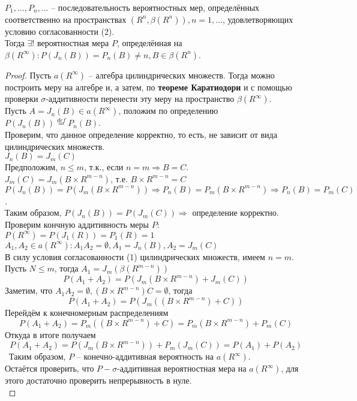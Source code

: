 \begin{theorem}
$P_1,...,P_n,...$ -- последовательность вероятностных мер, определённых соответственно на пространствах $(R^n, \beta (R^n)), n=1,...$, удовлетворяющих условию согласованности (2).\\
Тогда $\exists!$ вероятностная мера $P$, определённая на $\beta (R^\infty) : P(J_n(B))=P_n(B)\ne n, B \in \beta (R^n)$.
\end{theorem}
\begin{proof}
Пусть $a(R^\infty)$ -- алгебра цилиндрических множеств. Тогда можно построить меру на алгебре и, а затем, по \textbf{теореме Каратиодори} и с помощью проверки $\sigma$-аддитивности перенести эту меру на пространство $\beta (R^\infty)$.\\
Пусть $A=J_n(B)\in a(R^\infty)$, положим по определению $P(J_n(B))\stackrel{def}{=}P_n(B)$.\\
Проверим, что данное определение корректно, то есть, не зависит от вида цилиндрических множеств.\\
$J_n(B)=J_m(C)$\\
Предположим, $n\leq m$, т.к., если $n=m\Rightarrow B=C$.\\
$J_m(C)=J_m(B\times R^{m-n})$, т.е. $B\times R^{m-n}=C$\\
$P(J_n(B))=P(J_m(B\times R^{m-n}))\Rightarrow P_n(B) = P_m(B\times R^{m-n})\Rightarrow P_n(B)=P_m(C)$.\\
Таким образом, $P(J_n(B))=P(J_m(C))\Rightarrow$ определение корректно.\\
Проверим кончную аддитивность меры $P$:\\
$P(R^\infty)=P(J_1(R))=P_1(R)=1$\\
$A_1, A_2\in a(R^\infty): A_1 A_2 =\emptyset, A_1=J_n(B), A_2=J_m(C)$\\
В силу условия согласованности (1) цилиндрических множеств, имеем $n=m$.\\
Пусть $N\leq m$, тогда $A_1=J_m(\beta (R^{m-n}))$
$$P(A_1+A_2)=P(J_m(B\times R^{m-n})+J_m(C))$$
Заметим, что $A_1 A_2 = \emptyset, (B\times R^{m-n})C=\emptyset$, тогда
$$P(A_1+A_2)=P(J_m((B\times R^{m-n})+C))$$
Перейдём к конечномерным распределениям
$$P(A_1+A_2)=P_m((B\times R^{m-n})+C)=P_m(B\times R^{m-n})+P_m(C)$$
Откуда в итоге получаем
$$P(A_1+A_2)=P(J_m(B\times R^{m-n}))+P_m(J_m(C))=P(A_1)+P(A_2)$$\
Таким образом, $P$ -- конечно-аддитивная вероятность на $a(R^\infty)$.\\
Остаётся проверить, что $P - \sigma$-аддитивная вероятностная мера на $a(R^\infty)$, для этого достаточно проверить непрерывность в нуле.\\

\end{proof}

